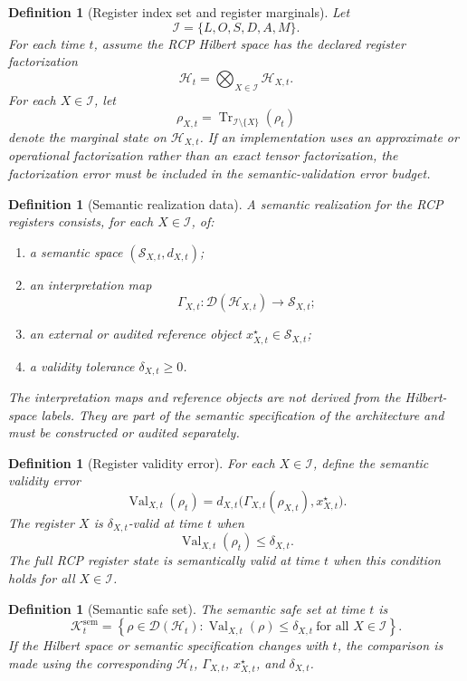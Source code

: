\documentclass[11pt]{article}
\newtheorem{definition}[theorem]{Definition}
\newcommand{\D}{\mathcal{D}}
\newcommand{\Hcal}{\mathcal{H}}
\newcommand{\Tr}{\operatorname{Tr}}
\newcommand{\1}{\mathbf{1}}
\newcommand{\Val}{\operatorname{Val}}
\providecommand{\Ical}{\mathcal{I}}
\providecommand{\Kcal}{\mathcal{K}}
\providecommand{\Scal}{\mathcal{S}}
\providecommand{\sem}{\mathrm{sem}}
\begin{document}
\begin{definition}[Register index set and register marginals]
\label{def:register_index_set_DG}
Let
\[
\Ical=\{L,O,S,D,A,M\}.
\]
For each time \(t\), assume the RCP Hilbert space has the declared register factorization
\[
\Hcal_t=\bigotimes_{X\in\Ical}\Hcal_{X,t}.
\]
For each \(X\in\Ical\), let
\[
\rho_{X,t}=\Tr_{\Ical\setminus\{X\}}(\rho_t)
\]
denote the marginal state on \(\Hcal_{X,t}\).  If an implementation uses an approximate or operational factorization rather than an exact tensor factorization, the factorization error must be included in the semantic-validation error budget.
\end{definition}

\begin{definition}[Semantic realization data]
\label{def:semantic_realization_data}
A semantic realization for the RCP registers consists, for each \(X\in\Ical\), of:
\begin{enumerate}[label=(\alph*)]
    \item a semantic space \((\Scal_{X,t},d_{X,t})\);
    \item an interpretation map
    \[
    \Gamma_{X,t}:\D(\Hcal_{X,t})\to\Scal_{X,t};
    \]
    \item an external or audited reference object \(x^{\star}_{X,t}\in\Scal_{X,t}\);
    \item a validity tolerance \(\delta_{X,t}\ge0\).
\end{enumerate}
The interpretation maps and reference objects are not derived from the Hilbert-space labels.  They are part of the semantic specification of the architecture and must be constructed or audited separately.
\end{definition}

\begin{definition}[Register validity error]
\label{def:register_validity_error}
For each \(X\in\Ical\), define the semantic validity error
\[
\Val_{X,t}(\rho_t)
=
d_{X,t}\bigl(\Gamma_{X,t}(\rho_{X,t}),x^{\star}_{X,t}\bigr).
\]
The register \(X\) is \(\delta_{X,t}\)-valid at time \(t\) when
\[
\Val_{X,t}(\rho_t)\le\delta_{X,t}.
\]
The full RCP register state is semantically valid at time \(t\) when this condition holds for all \(X\in\Ical\).
\end{definition}

\begin{definition}[Semantic safe set]
\label{def:semantic_safe_set}
The semantic safe set at time \(t\) is
\[
\Kcal_t^{\sem}
=
\left\{
\rho\in\D(\Hcal_t):
\Val_{X,t}(\rho)\le\delta_{X,t}\ \text{for all }X\in\Ical
\right\}.
\]
If the Hilbert space or semantic specification changes with \(t\), the comparison is made using the corresponding \(\Hcal_t\), \(\Gamma_{X,t}\), \(x^{\star}_{X,t}\), and \(\delta_{X,t}\).
\end{definition}
\end{document}
